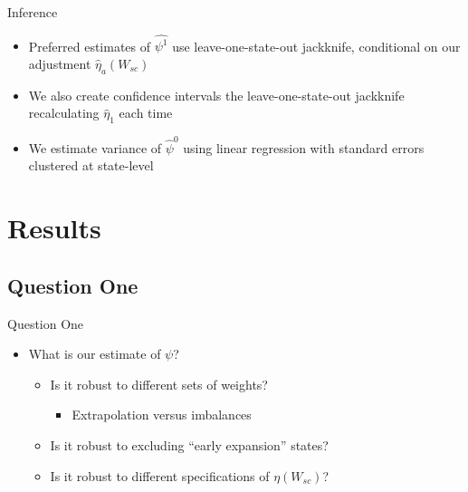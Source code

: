\documentclass[hyperref={pdfpagelabels=false}]{beamer}
\begin{document}
\begin{frame}{Inference}
    \begin{itemize}
        \item Preferred estimates of $\hat{\psi^1}$ use leave-one-state-out jackknife, conditional on our adjustment $\hat{\eta}_a(W_{sc})$ \bigskip
        \item We also create confidence intervals the leave-one-state-out jackknife recalculating $\hat{\eta}_1$ each time \bigskip
        \item We estimate variance of $\hat{\psi}^0$ using linear regression with standard errors clustered at state-level
    \end{itemize}
\end{frame}

\section{Results}

\subsection{Question One}

\begin{frame}{Question One}
    \begin{itemize}
        \item What is our estimate of $\psi$? \bigskip
        \begin{itemize}
            \item Is it robust to different sets of weights? \bigskip
            \begin{itemize}
                \item Extrapolation versus imbalances \bigskip
            \end{itemize}
            \item Is it robust to excluding ``early expansion'' states? \bigskip
            \item Is it robust to different specifications of $\eta(W_{sc})$? \bigskip
        \end{itemize}
    \end{itemize}
\end{frame}
\end{document}

